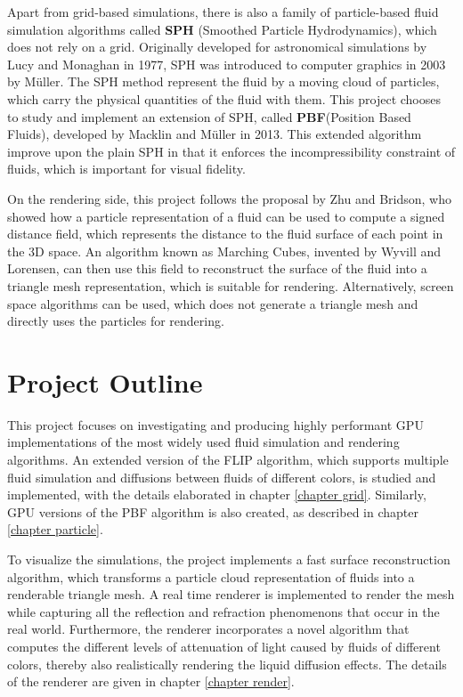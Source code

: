 Apart from grid-based simulations, there is also a family of particle-based fluid simulation algorithms called \textbf{SPH} (Smoothed Particle Hydrodynamics), which does not rely on a grid. Originally developed for astronomical simulations by Lucy\cite{lucy1977numerical} and Monaghan \cite{monaghan1992smoothed} in 1977, SPH was introduced to computer graphics in 2003 by Müller\cite{muller2003particle}. The SPH method represent the fluid by a moving cloud of particles, which carry the physical quantities of the fluid with them. This project chooses to study and implement an extension of SPH, called \textbf{PBF}(Position Based Fluids), developed by Macklin and Müller\cite{macklin2013position} in 2013. This extended algorithm improve upon the plain SPH in that it enforces the incompressibility constraint of fluids, which is important for visual fidelity. 


On the rendering side, this project follows the proposal by Zhu and Bridson\cite{zhu2005animating}, who showed how a particle representation of a fluid can be used to compute a signed distance field, which represents the distance to the fluid surface of each point in the 3D space. An algorithm known as Marching Cubes, invented by Wyvill\cite{wyvill1986soft} and Lorensen\cite{lorensen1987marching}, can then use this field to reconstruct the surface of the fluid into a triangle mesh representation, which is suitable for rendering. Alternatively, screen space algorithms\cite{van2009screen} can be used, which does not generate a triangle mesh and directly uses the particles for rendering.



\section{Project Outline}


This project focuses on investigating and producing highly performant GPU implementations of the most widely used fluid simulation and rendering algorithms. An extended version of the FLIP algorithm, which supports multiple fluid simulation and diffusions between fluids of different colors, is studied and implemented, with the details elaborated in chapter \ref{chapter grid}. Similarly, GPU versions of the PBF algorithm is also created, as described in chapter \ref{chapter particle}. 

To visualize the simulations, the project implements a fast surface reconstruction algorithm, which transforms a particle cloud representation of fluids into a renderable triangle mesh. A real time renderer is implemented to render the mesh while capturing all the reflection and refraction phenomenons that occur in the real world. Furthermore, the renderer incorporates a novel algorithm that computes the different levels of attenuation of light caused by fluids of different colors, thereby also realistically rendering the liquid diffusion effects. The details of the renderer are given in chapter \ref{chapter render}.

